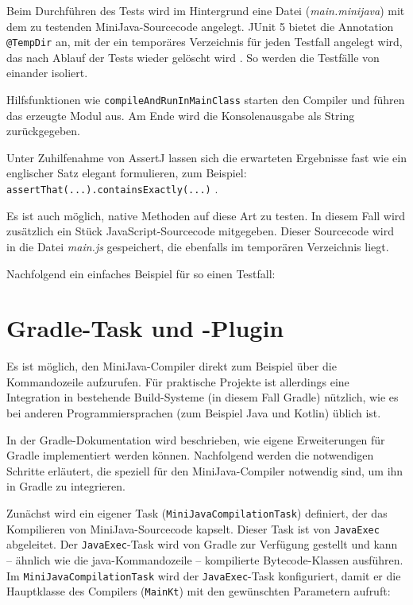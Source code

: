 Beim Durchführen des Tests wird im Hintergrund eine Datei (\emph{main.minijava}) mit dem zu testenden MiniJava-Sourcecode angelegt. JUnit 5 bietet die Annotation \lstinline{@TempDir} an, mit der ein temporäres Verzeichnis für jeden Testfall angelegt wird, das nach Ablauf der Tests wieder gelöscht wird \cite{JUnit}. So werden die Testfälle von einander isoliert.

Hilfsfunktionen wie \lstinline{compileAndRunInMainClass} starten den Compiler und führen das erzeugte Modul aus. Am Ende wird die Konsolenausgabe als String zurückgegeben.

Unter Zuhilfenahme von AssertJ lassen sich die erwarteten Ergebnisse fast wie ein englischer Satz elegant formulieren, zum Beispiel: \lstinline{assertThat(...).containsExactly(...)} \cite{AssertJ}.

Es ist auch möglich, native Methoden auf diese Art zu testen. In diesem Fall wird zusätzlich ein Stück JavaScript-Sourcecode mitgegeben. Dieser Sourcecode wird in die Datei \emph{main.js} gespeichert, die ebenfalls im temporären Verzeichnis liegt.

Nachfolgend ein einfaches Beispiel für so einen Testfall:



\section{Gradle-Task und -Plugin}

Es ist möglich, den MiniJava-Compiler direkt zum Beispiel über die Kommandozeile aufzurufen. Für praktische Projekte ist allerdings eine Integration in bestehende Build-Systeme (in diesem Fall Gradle) nützlich, wie es bei anderen Programmiersprachen (zum Beispiel Java und Kotlin) üblich ist.

In der Gradle-Dokumentation \cite{Gradle} wird beschrieben, wie eigene Erweiterungen für Gradle implementiert werden können. Nachfolgend werden die notwendigen Schritte erläutert, die speziell für den MiniJava-Compiler notwendig sind, um ihn in Gradle zu integrieren.

Zunächst wird ein eigener Task (\lstinline{MiniJavaCompilationTask}) definiert, der das Kompilieren von MiniJava-Sourcecode kapselt. Dieser Task ist von \lstinline{JavaExec} abgeleitet. Der \lstinline{JavaExec}-Task wird von Gradle zur Verfügung gestellt und kann -- ähnlich wie die java-Kommandozeile -- kompilierte Bytecode-Klassen ausführen. Im \lstinline{MiniJavaCompilationTask} wird der \lstinline{JavaExec}-Task konfiguriert, damit er die Hauptklasse des Compilers (\lstinline{MainKt}) mit den gewünschten Parametern aufruft:

